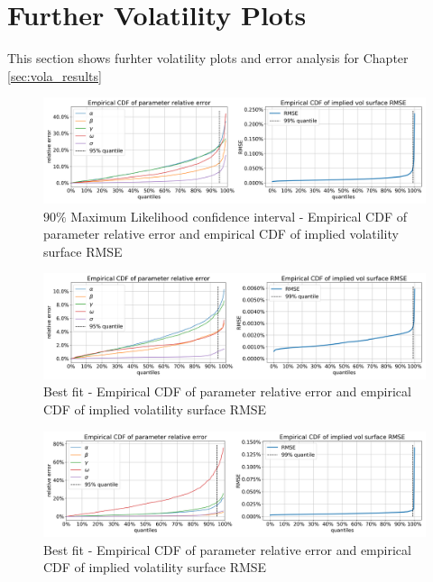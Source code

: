 \documentclass{article}
\begin{document}
\section{Further Volatility Plots}\label{sec:app_vola_plots}
This section shows furhter volatility plots and error analysis for Chapter \ref{sec:vola_results}
\begin{figure}[!ht]
\centering
\includegraphics[width=\textwidth]{MLE_Vola_HNG_ErrorCDF.png}
\caption{$90\%$ Maximum Likelihood confidence interval - Empirical CDF of parameter relative error and empirical CDF of implied volatility surface RMSE}
\label{fig:MLE_CDF}
\end{figure}
\begin{figure}[!ht]
\centering
\includegraphics[width=\textwidth]{Low_error_HNG_ErrorCDF.png}
\caption{Best fit - Empirical CDF of parameter relative error and empirical CDF of implied volatility surface RMSE}
\label{fig:low_err_CDF}
\end{figure}
\begin{figure}[!ht]
\centering
\includegraphics[width=\textwidth]{Small_g_HNG_ErrorCDF.png}
\caption{Best fit - Empirical CDF of parameter relative error and empirical CDF of implied volatility surface RMSE}
\label{fig:small_g_CDF}
\end{figure}
\end{document}
